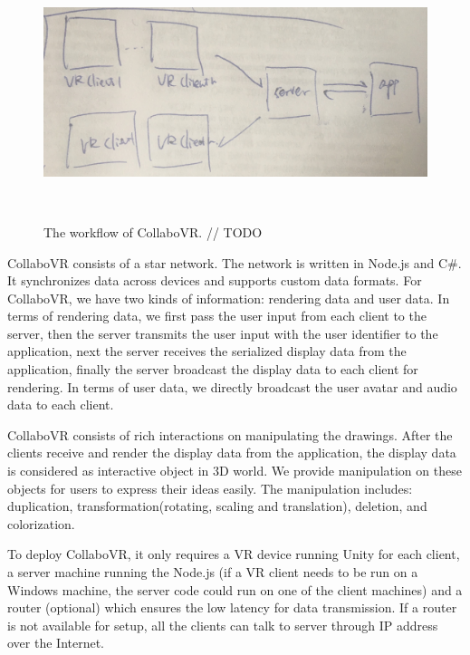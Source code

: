 \documentclass{sigchi}
\begin{document}
\begin{figure}[ht!]
 \centering
 \includegraphics[width=1.75\columnwidth]{workflow}
 \caption{The workflow of CollaboVR.
 // TODO
 }~\label{fig:workflow}
\end{figure}

CollaboVR consists of a star network. The network is written in Node.js and C\#. It synchronizes data across devices and supports custom data formats. For CollaboVR, we have two kinds of information: rendering data and user data. In terms of rendering data, we first pass the user input from each client to the server, then the server transmits the user input with the user identifier to the application, next the server receives the serialized display data from the application, finally the server broadcast the display data to each client for rendering. In terms of user data, we directly broadcast the user avatar and audio data to each client.

CollaboVR consists of rich interactions on manipulating the drawings. After the clients receive and render the display data from the application, the display data is considered as interactive object in 3D world. We provide manipulation on these objects for users to express their ideas easily. The manipulation includes: duplication, transformation(rotating, scaling and translation), deletion, and colorization.

To deploy CollaboVR, it only requires a VR device running Unity for each client, a server machine running the Node.js (if a VR client needs to be run on a Windows machine, the server code could run on one of the client machines) and a router (optional) which ensures the low latency for data transmission. If a router is not available for setup, all the clients can talk to server through IP address over the Internet. 
\end{document}
